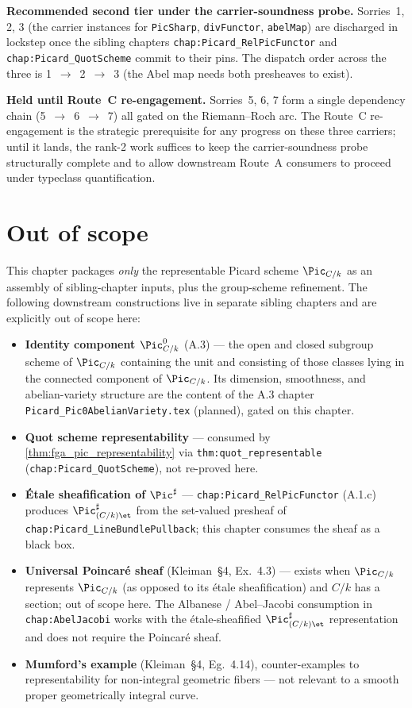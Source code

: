 \textbf{Recommended second tier under the carrier-soundness probe.}
Sorries~1, 2, 3 (the carrier instances for
\texttt{PicSharp}, \texttt{divFunctor}, \texttt{abelMap}) are
discharged in lockstep once the sibling chapters
\texttt{chap:Picard\_RelPicFunctor} and \texttt{chap:Picard\_QuotScheme}
commit to their pins. The dispatch order across the three is
1~$\to$~2~$\to$~3 (the Abel map needs both presheaves to exist).

\textbf{Held until Route~C re-engagement.} Sorries~5, 6, 7 form a
single dependency chain (5~$\to$~6~$\to$~7) all gated on the
Riemann--Roch arc. The Route~C re-engagement is the strategic
prerequisite for any progress on these three carriers; until it
lands, the rank-2 work suffices to keep the carrier-soundness probe
structurally complete and to allow downstream Route~A consumers to
proceed under typeclass quantification.

\section{Out of scope}
\label{sec:fga_pic_out_of_scope}

This chapter packages \emph{only} the representable Picard scheme
\(\Pic_{C/k}\) as an assembly of sibling-chapter inputs, plus the
group-scheme refinement. The following downstream constructions live in
separate sibling chapters and are explicitly out of scope here:
\begin{itemize}
  \item \textbf{Identity component \(\Pic^0_{C/k}\)} (A.3) --- the open and
    closed subgroup scheme of \(\Pic_{C/k}\) containing the unit and
    consisting of those classes lying in the connected component of
    \(\Pic_{C/k}\). Its dimension, smoothness, and abelian-variety
    structure are the content of the A.3 chapter
    \texttt{Picard\_Pic0AbelianVariety.tex} (planned), gated on this
    chapter.
  \item \textbf{Quot scheme representability} --- consumed by
    \cref{thm:fga_pic_representability} via \texttt{thm:quot\_representable}
    (\texttt{chap:Picard\_QuotScheme}), not re-proved here.
  \item \textbf{\'Etale sheafification of \(\Pic^\sharp\)} ---
    \texttt{chap:Picard\_RelPicFunctor} (A.1.c) produces
    \(\Pic^\sharp_{(C/k)\et}\) from the set-valued presheaf of
    \texttt{chap:Picard\_LineBundlePullback}; this chapter consumes the
    sheaf as a black box.
  \item \textbf{Universal Poincar\'e sheaf} (Kleiman~\S 4, Ex.~4.3)
    --- exists when \(\Pic_{C/k}\) represents \(\Pic_{C/k}\) (as opposed to
    its \'etale sheafification) and \(C/k\) has a section; out of scope
    here. The Albanese / Abel--Jacobi consumption in
    \texttt{chap:AbelJacobi} works with the \'etale-sheafified
    \(\Pic^\sharp_{(C/k)\et}\) representation and does not require the
    Poincar\'e sheaf.
  \item \textbf{Mumford's example} (Kleiman~\S 4, Eg.~4.14), counter-examples
    to representability for non-integral geometric fibers --- not
    relevant to a smooth proper geometrically integral curve.
\end{itemize}

